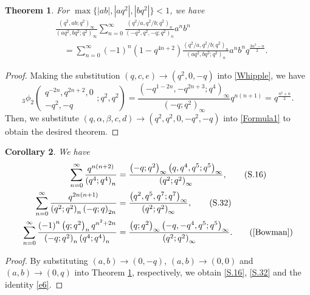 \documentclass[reqno,12pt]{amsart}
\newtheorem{theorem}{Theorem}[section]%
\newtheorem{corollary}[theorem]{Corollary}
\theoremstyle{remark}
\numberwithin{equation}{section}
\begin{document}
\begin{theorem}\label{thm11}
For $\max\{|ab|,|aq^2|,|bq^2|\}<1$, we have
\begin{align*}
&\frac{\left(q^2,ab;q^2\right)_{\infty}}{\left(aq^2,bq^2;q^2\right)_{\infty}}
\sum_{n=0}^{\infty}
\frac{\left(q^2/a,q^2/b;q^2\right)_n}{\left(-q^2,q^2,-q;q^2\right)_n}a^nb^n\\
&\quad=\sum_{n=0}^{\infty}\left(-1\right)^n\left(1-q^{4n+2}\right)
\frac{\left(q^2/a,q^2/b;q^2\right)_n}{\left(aq^2,bq^2;q^2\right)_n}
a^nb^nq^{\frac{3n^2-n}{2}}.
\end{align*}
\end{theorem}
\begin{proof}
Making the substitution $\left(q,c,e\right)\to\left(q^2,0,-q\right)$ into \eqref{Whipple}, we have
\begin{equation}\label{A13}
{_3\phi_2}\left(
\begin{array}{ccc}
q^{-2n},q^{2n+2},0\\
-q^2,-q
\end{array};q^2,q^2\right)
=
\frac{\left(-q^{1-2n},-q^{2n+3};q^4\right)_{\infty}}{\left(-q;q^2\right)_{\infty}}
q^{n\left(n+1\right)}=q^{\frac{n^2+n}{2}}.
\end{equation}
Then, we substitute $\left(q,\alpha,\beta,c,d\right)\to\left(q^2,q^2,0,-q^2,-q\right)$ into \eqref{Formula1} to obtain the desired theorem.
\end{proof}
\begin{corollary}
We have
\begin{align}
\sum_{n=0}^{\infty}\frac{q^{n\left(n+2\right)}}{\left(q^4;q^4\right)_n}
&=\frac{\left(-q;q^2\right)_{\infty}\left(q,q^4,q^5;q^5\right)_{\infty}}
{\left(q^2;q^2\right)_{\infty}}
,\tag{S.16}\label{S.16}\\
\sum_{n=0}^{\infty}\frac{q^{2n\left(n+1\right)}}
{\left(q^2;q^2\right)_n\left(-q;q\right)_{2n}}
&=\frac{\left(q^2,q^5,q^7;q^7\right)_{\infty}}
{\left(q^2;q^2\right)_{\infty}},\tag{S.32}\label{S.32}\\
\sum_{n=0}^{\infty}\frac{\left(-1\right)^n\left(q;q^2\right)_nq^{n^2+2n}}
{\left(-q;q^2\right)_{n}\left(q^4;q^4\right)_n}
&=\frac{\left(q;q^2\right)_{\infty}\left(-q,-q^4,q^5;q^5\right)_{\infty}}
{\left(q^2;q^2\right)_{\infty}}.\tag{\rm{\cite[Eq. (2.23)]{Bowman}}}\label{e6}
\end{align}
\end{corollary}
\begin{proof}
By substituting $\left(a,b\right)\to\left(0,-q\right)$, $\left(a,b\right)\to\left(0,0\right)$ and $\left(a,b\right)\to\left(0,q\right)$ into Theorem \ref{thm11}, respectively, we obtain \eqref{S.16}, \eqref{S.32} and the identity \ref{e6}.
\end{proof}
\end{document}

